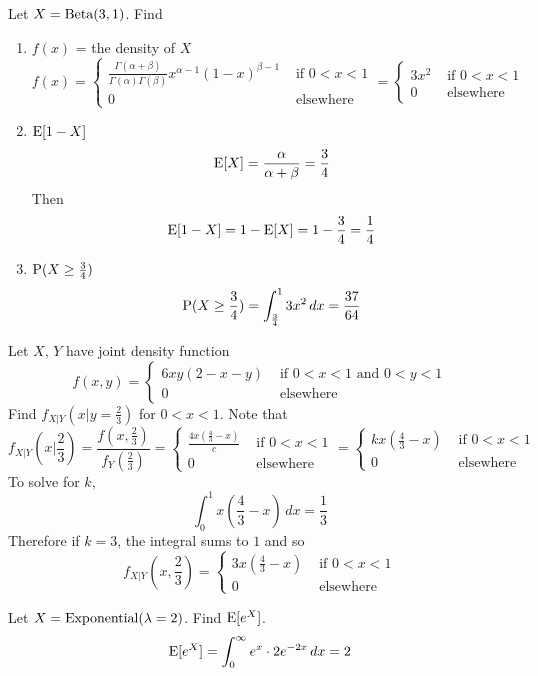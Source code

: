 \documentclass[12pt]{article}
\begin{document}
\begin{question} Let $X = \text{Beta}( 3,1 )$. Find \begin{enumerate} 
\item $f(x)$ = the density of $X$ 
$$ f(x) = \begin{cases} \frac{\Gamma(\alpha+\beta)}{\Gamma(\alpha)\Gamma(\beta)} x^{\alpha-1} (1-x)^{\beta-1} &\text{ if } 0 < x < 1 \\ 0 &\text{ elsewhere} \end{cases} = \begin{cases} 3x^2 &\text{ if } 0 < x < 1 \\ 0 &\text{ elsewhere } \end{cases} $$ 
\item $\mathrm{E}[ 1-X ]$ 
$$ \mathrm{E}[ X ] = \frac{\alpha}{\alpha+\beta} = \frac{3}{4} $$ 
Then $$ \mathrm{E}[ 1-X ] = 1 - \mathrm{E}[ X ] = 1 - \frac{3}{4} = \frac{1}{4}$$ 
\item $\mathrm{P}( X \geq \frac{3}{4} )$ 
$$ \mathrm{P}( X \geq \frac{3}{4} ) = \int_{\frac{3}{4}}^1 3x^2 \, dx = \frac{37}{64} $$ 
\end{enumerate} \end{question} 

\begin{question}Let $X$, $Y$ have joint density function $$ f(x,y) = \begin{cases} 6xy(2-x-y) &\text{ if } 0 < x < 1 \text{ and } 0 < y < 1 \\ 0 &\text{ elsewhere} \end{cases} $$ 
Find $f_{X|Y}(x|y = \frac{2}{3})$ for $0 < x < 1$. 
Note that $$ f_{X|Y}(x|\frac{2}{3}) = \frac{f(x, \frac{2}{3})}{f_Y(\frac{2}{3})} = \begin{cases} \frac{4x(\frac{4}{3}-x)}{c} &\text{ if } 0 < x < 1 \\ 0 &\text{ elsewhere } \end{cases} = \begin{cases} kx(\frac{4}{3} - x) &\text{ if } 0 < x < 1 \\ 0 &\text{ elsewhere } \end{cases} $$ 
To solve for $k$, $$ \int_0^1 x(\frac{4}{3}-x) \, dx = \frac{1}{3}$$ Therefore if $k = 3$, the integral sums to $1$ and so $$ f_{X|Y}(x, \frac{2}{3}) = \begin{cases} 3x(\frac{4}{3} - x) &\text{ if } 0 < x < 1 \\ 0 &\text{ elsewhere } \end{cases} $$ 
\end{question} 

\begin{question} Let $X = \text{Exponential}( \lambda = 2 )$. Find $\mathrm{E}[ e^X ]$. 
$$ \mathrm{E}[ e^X ] = \int_0^\infty e^x \cdot 2e^{-2x} \, dx = 2 $$ 
\end{question} 
\end{document}
